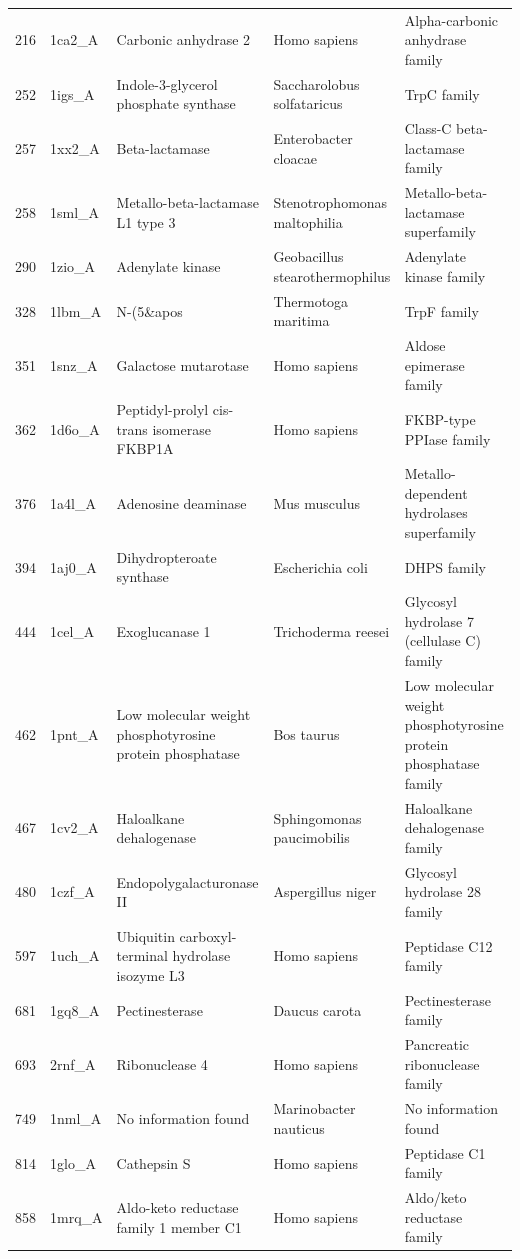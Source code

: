 \documentclass[
]{article}
\begin{document}
\begin{table}[!h]
{\begin{tabular}[t]{rl>{\raggedright\arraybackslash}p{4cm}>{\raggedright\arraybackslash}p{4cm}>{\raggedright\arraybackslash}p{4cm}}
216 & 1ca2\_A & Carbonic anhydrase 2 & Homo sapiens & Alpha-carbonic anhydrase family\\
252 & 1igs\_A & Indole-3-glycerol phosphate synthase & Saccharolobus solfataricus & TrpC family\\
257 & 1xx2\_A & Beta-lactamase & Enterobacter cloacae & Class-C beta-lactamase family\\
258 & 1sml\_A & Metallo-beta-lactamase L1 type 3 & Stenotrophomonas maltophilia & Metallo-beta-lactamase superfamily\\
290 & 1zio\_A & Adenylate kinase & Geobacillus stearothermophilus & Adenylate kinase family\\
328 & 1lbm\_A & N-(5\&apos & Thermotoga maritima & TrpF family\\
351 & 1snz\_A & Galactose mutarotase & Homo sapiens & Aldose epimerase family\\
362 & 1d6o\_A & Peptidyl-prolyl cis-trans isomerase FKBP1A & Homo sapiens & FKBP-type PPIase family\\
376 & 1a4l\_A & Adenosine deaminase & Mus musculus & Metallo-dependent hydrolases superfamily\\
394 & 1aj0\_A & Dihydropteroate synthase & Escherichia coli & DHPS family\\
444 & 1cel\_A & Exoglucanase 1 & Trichoderma reesei & Glycosyl hydrolase 7 (cellulase C) family\\
462 & 1pnt\_A & Low molecular weight phosphotyrosine protein phosphatase & Bos taurus & Low molecular weight phosphotyrosine protein phosphatase family\\
467 & 1cv2\_A & Haloalkane dehalogenase & Sphingomonas paucimobilis & Haloalkane dehalogenase family\\
480 & 1czf\_A & Endopolygalacturonase II & Aspergillus niger & Glycosyl hydrolase 28 family\\
597 & 1uch\_A & Ubiquitin carboxyl-terminal hydrolase isozyme L3 & Homo sapiens & Peptidase C12 family\\
681 & 1gq8\_A & Pectinesterase & Daucus carota & Pectinesterase family\\
693 & 2rnf\_A & Ribonuclease 4 & Homo sapiens & Pancreatic ribonuclease family\\
749 & 1nml\_A & No information found & Marinobacter nauticus & No information found\\
814 & 1glo\_A & Cathepsin S & Homo sapiens & Peptidase C1 family\\
858 & 1mrq\_A & Aldo-keto reductase family 1 member C1 & Homo sapiens & Aldo/keto reductase family\\

\end{tabular}}
\end{table}
\end{document}
